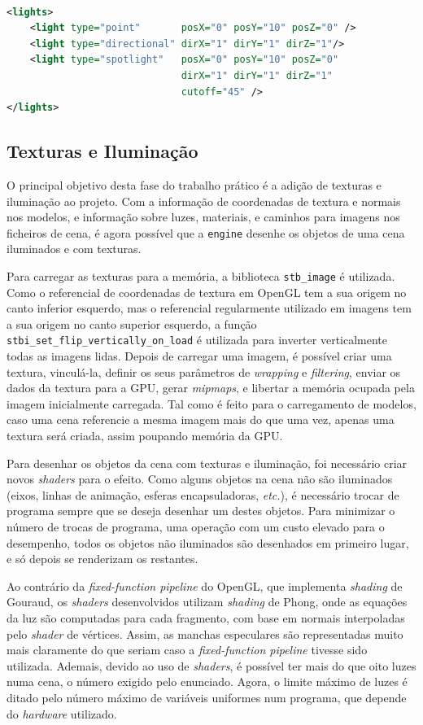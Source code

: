 \documentclass[12pt, a4paper]{article}
\begin{document}
\begin{lstlisting}[language=xml]

<lights>
    <light type="point"       posX="0" posY="10" posZ="0" />
    <light type="directional" dirX="1" dirY="1" dirZ="1"/>
    <light type="spotlight"   posX="0" posY="10" posZ="0"
                              dirX="1" dirY="1" dirZ="1"
                              cutoff="45" />
</lights>
\end{lstlisting}

\subsection{Texturas e Iluminação}

O principal objetivo desta fase do trabalho prático é a adição de texturas e iluminação ao projeto.
Com a informação de coordenadas de textura e normais nos modelos, e informação sobre luzes,
materiais, e caminhos para imagens nos ficheiros de cena, é agora possível que a \texttt{engine}
desenhe os objetos de uma cena iluminados e com texturas.

Para carregar as texturas para a memória, a biblioteca \texttt{stb\_image} \cite{stb-image} é
utilizada. Como o referencial de coordenadas de textura em OpenGL tem a sua origem no canto inferior
esquerdo, mas o referencial regularmente utilizado em imagens tem a sua origem no canto superior
esquerdo, a função \texttt{stbi\_set\_flip\_vertically\_on\_load} é utilizada para inverter
verticalmente todas as imagens lidas. Depois de carregar uma imagem, é possível criar uma textura,
vinculá-la, definir os seus parâmetros de \emph{wrapping} e \emph{filtering}, enviar os dados da
textura para a GPU, gerar \emph{mipmaps}, e libertar a memória ocupada pela imagem inicialmente
carregada. Tal como é feito para o carregamento de modelos, caso uma cena referencie a mesma imagem
mais do que uma vez, apenas uma textura será criada, assim poupando memória da GPU.

Para desenhar os objetos da cena com texturas e iluminação, foi necessário criar novos
\emph{shaders} para o efeito. Como alguns objetos na cena não são iluminados (eixos, linhas de
animação, esferas encapsuladoras, \emph{etc.}), é necessário trocar de programa sempre que se deseja
desenhar um destes objetos. Para minimizar o número de trocas de programa, uma operação com um custo
elevado para o desempenho, todos os objetos não iluminados são desenhados em primeiro lugar, e só
depois se renderizam os restantes.

Ao contrário da \emph{fixed-function pipeline} do OpenGL, que implementa \emph{shading} de Gouraud,
os \emph{shaders} desenvolvidos utilizam \emph{shading} de Phong, onde as equações da luz são
computadas para cada fragmento, com base em normais interpoladas pelo \emph{shader} de vértices.
Assim, as manchas especulares são representadas muito mais claramente do que seriam caso a
\emph{fixed-function pipeline} tivesse sido utilizada. Ademais, devido ao uso de \emph{shaders}, é
possível ter mais do que oito luzes numa cena, o número exigido pelo enunciado. Agora, o limite
máximo de luzes é ditado pelo número máximo de variáveis uniformes num programa, que depende do
\emph{hardware} utilizado.
\end{document}
